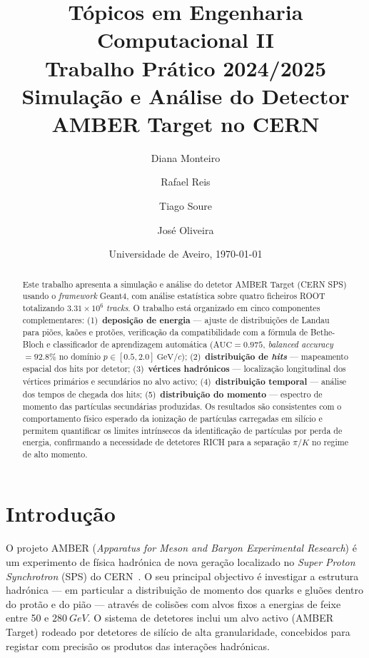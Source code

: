\documentclass[12pt,a4paper]{article}
\title{%
  \textbf{Tópicos em Engenharia Computacional II}\\[0.4em]
  \large Trabalho Prático 2024/2025\\[0.2em]
  \normalsize Simulação e Análise do Detector AMBER Target no CERN
}
\author{Diana Monteiro \and Rafael Reis \and Tiago Soure \and José Oliveira}
\date{Universidade de Aveiro, \today}
\begin{document}
\maketitle

\begin{abstract}
Este trabalho apresenta a simulação e análise do detetor AMBER Target
(CERN SPS) usando o \textit{framework} Geant4, com análise estatística
sobre quatro ficheiros ROOT totalizando $3.31 \times 10^6$ \textit{tracks}.
O trabalho está organizado em cinco componentes complementares:
(1)~\textbf{deposição de energia} — ajuste de distribuições de Landau para
piões, kaões e protões, verificação da compatibilidade com a fórmula de
Bethe-Bloch e classificador
de aprendizagem automática ($\text{AUC} = 0.975$, \textit{balanced accuracy}
$= 92.8\%$ no domínio $p \in [0.5, 2.0]~\text{GeV}/c$);
(2)~\textbf{distribuição de \textit{hits}} — mapeamento espacial dos hits por
detetor;
(3)~\textbf{vértices hadrónicos} — localização longitudinal dos vértices
primários e secundários no alvo activo;
(4)~\textbf{distribuição temporal} — análise dos tempos de chegada dos hits;
(5)~\textbf{distribuição do momento} — espectro de momento das partículas
secundárias produzidas.
Os resultados são consistentes com o comportamento físico esperado da
ionização de partículas carregadas em silício e permitem quantificar
os limites intrínsecos da identificação de partículas por perda de energia,
confirmando a necessidade de detetores RICH para a separação $\pi/K$ no
regime de alto momento.
\end{abstract}

\tableofcontents
\newpage

\section{Introdução}
\label{sec:intro}

O projeto AMBER (\textit{Apparatus for Meson and Baryon Experimental Research})
é um experimento de física hadrónica de nova geração localizado no
\textit{Super Proton Synchrotron} (SPS) do CERN~\cite{amber2022}. O seu
principal objectivo é investigar a estrutura hadrónica — em particular a
distribuição de momento dos quarks e gluões dentro do protão e do pião — através
de colisões com alvos fixos a energias de feixe entre 50 e $\SI{280}{GeV}$.
O sistema de detetores inclui um alvo activo (AMBER Target) rodeado por detetores
de silício de alta granularidade, concebidos para registar com precisão os produtos
das interações hadrónicas.
\end{document}
